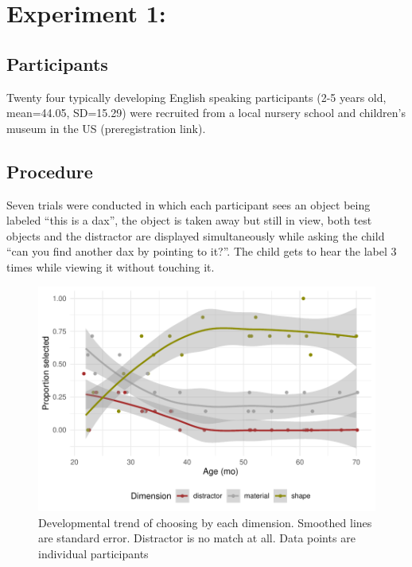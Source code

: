 \documentclass[10pt, letterpaper]{article}
\newenvironment{CodeChunk}{}{}
\begin{document}
\hypertarget{experiment-1}{%
\section{Experiment 1:}\label{experiment-1}}

\hypertarget{participants}{%
\subsection{Participants}\label{participants}}

Twenty four typically developing English speaking participants (2-5
years old, mean=44.05, SD=15.29) were recruited from a local nursery
school and children's museum in the US (preregistration link).

\hypertarget{procedure}{%
\subsection{Procedure}\label{procedure}}

Seven trials were conducted in which each participant sees an object
being labeled ``this is a dax'', the object is taken away but still in
view, both test objects and the distractor are displayed simultaneously
while asking the child ``can you find another dax by pointing to it?''.
The child gets to hear the label 3 times while viewing it without
touching it.

\begin{CodeChunk}
\begin{figure}[tb]
\includegraphics[width=1\linewidth]{figs/first_exp-1} \caption[Developmental trend of choosing by each dimension]{Developmental trend of choosing by each dimension. Smoothed lines are standard error. Distractor is no match at all. Data points are individual participants}\label{fig:first_exp}
\end{figure}
\end{CodeChunk}
\end{document}
